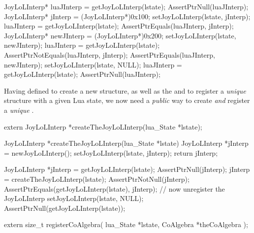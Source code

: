 
\startCTest
  JoyLoLInterp* luaJInterp = getJoyLoLInterp(lstate);
  AssertPtrNull(luaJInterp);
  JoyLoLInterp* jInterp = (JoyLoLInterp*)0x100;
  setJoyLoLInterp(lstate, jInterp);
  luaJInterp = getJoyLoLInterp(lstate);
  AssertPtrEquals(luaJInterp, jInterp);
  JoyLoLInterp* newJInterp = (JoyLoLInterp*)0x200;
  setJoyLoLInterp(lstate, newJInterp);
  luaJInterp = getJoyLoLInterp(lstate);
  AssertPtrNotEquals(luaJInterp, jInterp);
  AssertPtrEquals(luaJInterp, newJInterp);
  setJoyLoLInterp(lstate, NULL);
  luaJInterp = getJoyLoLInterp(lstate);
  AssertPtrNull(luaJInterp);
\stopCTest
\stopTestCase
\stopTestSuite

\startTestSuite[createTheJoyLoLInterp]

Having defined  to create a new  
structure, as well as the  and 
 to register a \emph{unique}  
structure with a given Lua state, we now need a \emph{public} way to 
create \emph{and} register a \emph{unique} . 

\startCHeader
extern JoyLoLInterp *createTheJoyLoLInterp(lua_State *lstate);
\stopCHeader

\startCCode
JoyLoLInterp *createTheJoyLoLInterp(lua_State *lstate) {
  JoyLoLInterp *jInterp = newJoyLoLInterp();
  setJoyLoLInterp(lstate, jInterp);
  return jInterp;
}
\stopCCode


\startCTest
  JoyLoLInterp *jInterp = getJoyLoLInterp(lstate);
  AssertPtrNull(jInterp);
  jInterp = createTheJoyLoLInterp(lstate);
  AssertPtrNotNull(jInterp);
  AssertPtrEquals(getJoyLoLInterp(lstate), jInterp);
  // now unregister the JoyLoLInterp
  setJoyLoLInterp(lstate, NULL);
  AssertPtrNull(getJoyLoLInterp(lstate));
\stopCTest
\stopTestCase
\stopTestSuite

\startTestSuite[registerCoAlgebra]

\startCHeader
extern size_t registerCoAlgebra(
  lua_State *lstate,
  CoAlgebra *theCoAlgebra
);
\stopCHeader

